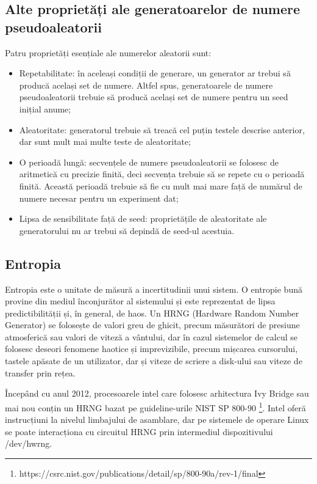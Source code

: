 \subsection{Alte proprietăți ale generatoarelor de numere pseudoaleatorii}

Patru proprietăți esențiale ale numerelor aleatorii sunt:
\begin{itemize}
    \item Repetabilitate: în aceleași condiții de generare, un generator ar trebui să producă același set de numere. Altfel spus, generatoarele de numere pseudoaleatorii trebuie să producă același set de numere pentru un seed inițial anume;
    \item Aleatoritate: generatorul trebuie să treacă cel puțin testele descrise anterior, dar sunt mult mai multe teste de aleatoritate;
    \item O perioadă lungă: secvențele de numere pseudoaleatorii se folosesc de aritmetică cu precizie finită, deci secvența trebuie să se repete cu o perioadă finită. Această perioadă trebuie să fie cu mult mai mare față de numărul de numere necesar pentru un experiment dat;
    \item Lipsa de sensibilitate față de seed: proprietățile de aleatoritate ale generatorului nu ar trebui să depindă de seed-ul acestuia.
\end{itemize}

\subsection{Entropia}

Entropia este o unitate de măsură a incertitudinii unui sistem. O entropie bună provine din mediul înconjurător al sistemului și este reprezentat de lipsa predictibilității și, în general, de haos. Un HRNG (Hardware Random Number Generator) se folosește de valori greu de ghicit, precum măsurători de presiune atmosferică sau valori de viteză a vântului, dar în cazul sistemelor de calcul se folosesc deseori fenomene haotice și imprevizibile, precum mișcarea cursorului, tastele apăsate de un utilizator, dar și viteze de scriere a disk-ului sau viteze de transfer prin rețea. 

Începând cu anul 2012, procesoarele intel care folosesc arhitectura Ivy Bridge sau mai nou conțin un HRNG bazat pe guideline-urile NIST SP 800-90 \footnote{https://csrc.nist.gov/publications/detail/sp/800-90a/rev-1/final}. Intel oferă instrucțiuni la nivelul limbajului de asamblare, dar pe sistemele de operare Linux se poate interacționa cu circuitul HRNG prin intermediul dispozitivului /dev/hwrng. 


